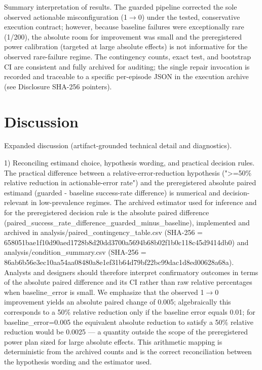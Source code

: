 \documentclass[conference]{IEEEtran}
\begin{document}
Summary interpretation of results. The guarded pipeline corrected the sole observed actionable misconfiguration (1\ensuremath{\rightarrow}0) under the tested, conservative execution contract; however, because baseline failures were exceptionally rare (1/200), the absolute room for improvement was small and the preregistered power calibration (targeted at large absolute effects) is not informative for the observed rare-failure regime. The contingency counts, exact test, and bootstrap CI are consistent and fully archived for auditing; the single repair invocation is recorded and traceable to a specific per-episode JSON in the execution archive (see Disclosure SHA-256 pointers).

\section{Discussion}
Expanded discussion (artifact-grounded technical detail and diagnostics).

1) Reconciling estimand choice, hypothesis wording, and practical decision rules. The practical difference between a relative-error‑reduction hypothesis (">=50\% relative reduction in actionable-error rate") and the preregistered absolute paired estimand (guarded - baseline success-rate difference) is numerical and decision-relevant in low-prevalence regimes. The archived estimator used for inference and for the preregistered decision rule is the absolute paired difference (paired\_success\_rate\_difference\_guarded\_minus\_baseline), implemented and archived in analysis/paired\_contingency\_table.csv (SHA-256 = 658051bae1f10d90aed1728b8d20dd3700a5694b68b02f1b0c118c45d9414db0) and analysis/condition\_summary.csv (SHA-256 = 86ab6b56e3ec10aa54aa08480a8e1ef31b64d79bf22bc99dac1d8ed00628a68a). Analysts and designers should therefore interpret confirmatory outcomes in terms of the absolute paired difference and its CI rather than raw relative percentages when baseline\_error is small. We emphasize that the observed 1\ensuremath{\rightarrow}0 improvement yields an absolute paired change of 0.005; algebraically this corresponds to a 50\% relative reduction only if the baseline error equals 0.01; for baseline\_error=0.005 the equivalent absolute reduction to satisfy a 50\% relative reduction would be 0.0025 --- a quantity outside the scope of the preregistered power plan sized for large absolute effects. This arithmetic mapping is deterministic from the archived counts and is the correct reconciliation between the hypothesis wording and the estimator used.
\end{document}
